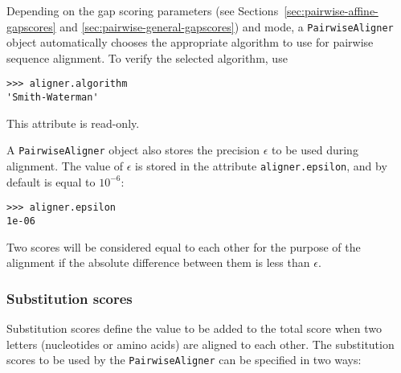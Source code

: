 Depending on the gap scoring parameters
(see Sections~\ref{sec:pairwise-affine-gapscores} and
\ref{sec:pairwise-general-gapscores}) and mode, a \verb+PairwiseAligner+ object
automatically chooses the appropriate algorithm to use for pairwise sequence alignment. To verify the selected algorithm, use

\begin{verbatim}
>>> aligner.algorithm
'Smith-Waterman'
\end{verbatim}
This attribute is read-only.

A \verb+PairwiseAligner+ object also stores the precision $\epsilon$ to be used during alignment. The value of $\epsilon$ is stored in the attribute \verb+aligner.epsilon+, and by default is equal to $10^{-6}$:


\begin{verbatim}
>>> aligner.epsilon
1e-06
\end{verbatim}
Two scores will be considered equal to each other for the purpose of the alignment if the absolute difference between them is less than $\epsilon$.

\subsubsection{Substitution scores}
\label{sec:pairwise-substitution-scores}

Substitution scores define the value to be added to the total score when two letters (nucleotides or amino acids) are aligned to each other. The substitution scores to be used by the \verb+PairwiseAligner+ can be specified in two ways:

